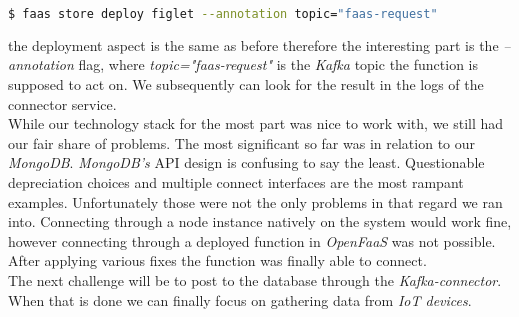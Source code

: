 \documentclass{article}
\begin{document}
  \begin{lstlisting}[language=bash]
    $ faas store deploy figlet --annotation topic="faas-request"
  \end{lstlisting}

  the deployment aspect is the same as before therefore the interesting part is the \textit{--annotation} flag, where \textit{topic="faas-request"} is the \textit{Kafka} topic the function is supposed to act on. We subsequently can look for the result in the logs of the connector service. \\
  While our technology stack for the most part was nice to work with, we still had our fair share of problems. The most significant so far was in relation to our \textit{MongoDB}. \textit{MongoDB’s} API design is confusing to say the least. Questionable depreciation choices and multiple connect interfaces are the most rampant examples. Unfortunately those were not the only problems in that regard we ran into. Connecting through a node instance natively on the system would work fine, however connecting through a deployed function in \textit{OpenFaaS} was not possible. After applying various fixes the function was finally able to connect. \\
  The next challenge will be to post to the database through the \textit{Kafka-connector}. When that is done we can finally focus on gathering data from \textit{IoT devices}.
\end{document}
